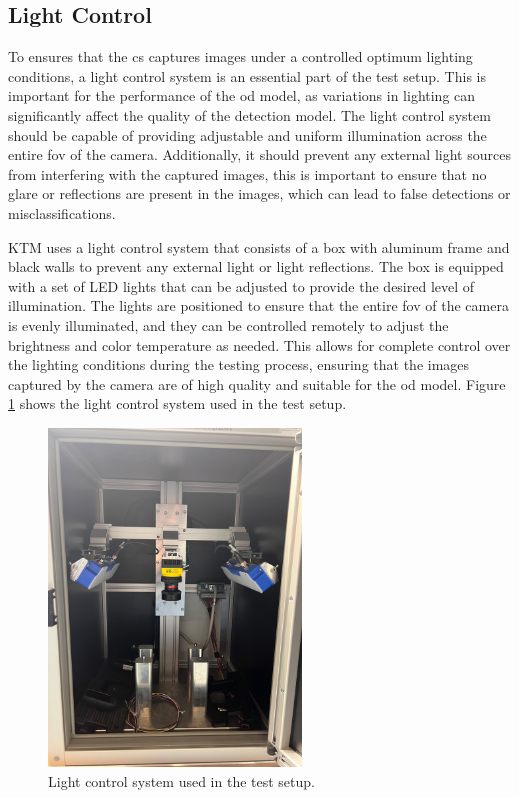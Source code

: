 \subsection{Light Control}
To ensures that the \gls{cs} captures images under a controlled optimum lighting conditions, a light control system is an essential part of the test setup. This is important for the performance of the \gls{od} model, as variations in lighting can significantly affect the quality of the detection model. The light control system should be capable of providing adjustable and uniform illumination across the entire \gls{fov} of the camera. Additionally, it should prevent any external light sources from interfering with the captured images, this is important to ensure that no glare or reflections are present in the images, which can lead to false detections or misclassifications.

KTM uses a light control system that consists of a box with aluminum frame and black walls to prevent any external light or light reflections. The box is equipped with a set of LED lights that can be adjusted to provide the desired level of illumination. The lights are positioned to ensure that the entire \gls{fov} of the camera is evenly illuminated, and they can be controlled remotely to adjust the brightness and color temperature as needed. This allows for complete control over the lighting conditions during the testing process, ensuring that the images captured by the camera are of high quality and suitable for the \gls{od} model. Figure \ref{LightControl} shows the light control system used in the test setup.

\begin{figure}[!htb]
    \centering
    \includegraphics[width=0.6\textwidth]{Figures/Light_Control_Box.jpg}
    \caption{Light control system used in the test setup.}
    \label{LightControl}
\end{figure}

